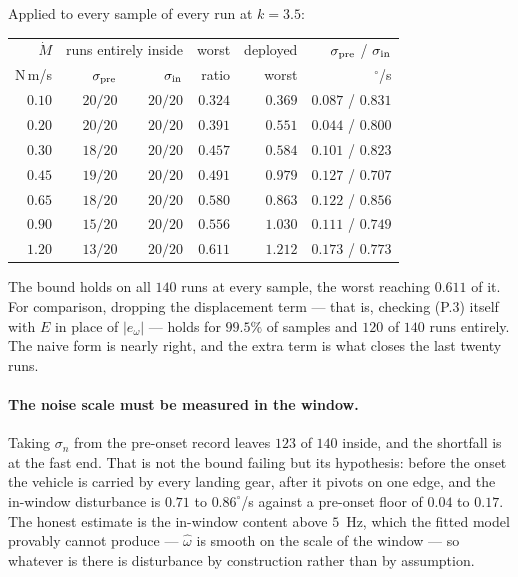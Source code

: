 \documentclass[10pt]{article}
\newcommand{\Mdot}{\dot M}
\begin{document}
Applied to every sample of every run at $k = 3.5$:

\begin{center}\small
\begin{tabular}{@{}rrrrrr@{}}
\toprule
$\Mdot$ & \multicolumn{2}{c}{runs entirely inside}
        & worst & deployed & $\sigma_{\rm pre}$ / $\sigma_{\rm in}$\\
N\,m/s & $\sigma_{\rm pre}$ & $\sigma_{\rm in}$ & ratio & worst
       & $^\circ$/s\\
\midrule
$0.10$ & $20/20$ & $20/20$ & $0.324$ & $0.369$ & $0.087$ / $0.831$\\
$0.20$ & $20/20$ & $20/20$ & $0.391$ & $0.551$ & $0.044$ / $0.800$\\
$0.30$ & $18/20$ & $20/20$ & $0.457$ & $0.584$ & $0.101$ / $0.823$\\
$0.45$ & $19/20$ & $20/20$ & $0.491$ & $0.979$ & $0.127$ / $0.707$\\
$0.65$ & $18/20$ & $20/20$ & $0.580$ & $0.863$ & $0.122$ / $0.856$\\
$0.90$ & $15/20$ & $20/20$ & $0.556$ & $1.030$ & $0.111$ / $0.749$\\
$1.20$ & $13/20$ & $20/20$ & $0.611$ & $1.212$ & $0.173$ / $0.773$\\
\bottomrule
\end{tabular}
\end{center}

The bound holds on all $140$ runs at every sample, the worst reaching
$0.611$ of it. For comparison, dropping the displacement term --- that
is, checking (P.3) itself with $E$ in place of $|e_\omega|$ --- holds
for $99.5\%$ of samples and $120$ of $140$ runs entirely. The naive form
is nearly right, and the extra term is what closes the last twenty runs.

\paragraph{The noise scale must be measured in the window.} Taking
$\sigma_n$ from the pre-onset record leaves $123$ of $140$ inside, and
the shortfall is at the fast end. That is not the bound failing but its
hypothesis: before the onset the vehicle is carried by every landing
gear, after it pivots on one edge, and the in-window disturbance is
$0.71$ to $0.86^\circ$/s against a pre-onset floor of $0.04$ to $0.17$.
The honest estimate is the in-window content above $5$~Hz, which the
fitted model provably cannot produce --- $\hat\omega$ is smooth on the
scale of the window --- so whatever is there is disturbance by
construction rather than by assumption.
\end{document}
